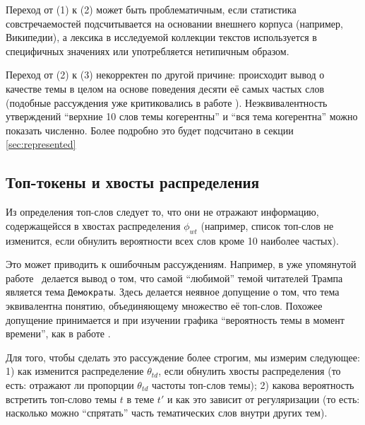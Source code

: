 Переход от (1) к (2) может быть проблематичным, если статистика совстречаемостей подсчитывается на основании внешнего корпуса (например, Википедии), а лексика в исследуемой коллекции текстов используется в специфичных значениях или употребляется нетипичным образом.

Переход от (2) к (3) некорректен по другой причине: происходит вывод о качестве темы в целом на основе поведения десяти её самых частых слов (подобные рассуждения уже критиковались в работе  \cite{dh_sea}). Неэквивалентность утверждений ``верхние 10 слов темы когерентны'' и ``вся тема когерентна'' можно показать численно. Более подробно это будет подсчитано в секции \ref{sec:represented}


\subsection{Топ-токены и хвосты распределения}


Из определения топ-слов следует то, что они не отражают информацию, содержащейсся в хвостах распределения $\phi_{wt}$ (например, список топ-слов не изменится, если обнулить вероятности всех слов кроме 10 наиболее частых).

Это может приводить к ошибочным рассуждениям. Например, в уже упомянутой работе~\cite{wang2016catching} делается вывод о том, что самой ``любимой'' темой читателей Трампа является тема \texttt{Демократы}. Здесь делается неявное допущение о том, что тема эквивалентна понятию, объединяющему множество её топ-слов. Похожее допущение принимается и при изучении графика ``вероятность темы в момент времени'', как в работе \cite{monsters_men, dispatch}.

Для того, чтобы сделать это рассуждение более строгим, мы измерим следующее: 1) как изменится распределение $\theta_{td}$, если обнулить хвосты распределения (то есть: отражают ли пропорции $\theta_{td}$ частоты топ-слов темы); 2) какова вероятность встретить топ-слово темы $t$ в теме $t'$ и как это зависит от регуляризации (то есть: насколько можно ``спрятать'' часть тематических слов внутри других тем).

